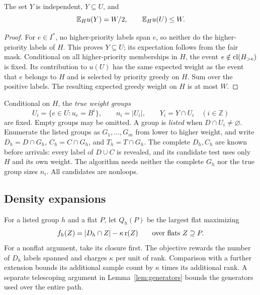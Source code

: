 \begin{lemma}\label{lem:filter}
The set $Y$ is independent, $Y\subseteq U$, and
\begin{equation}\label{eq:candidate-mass}
 \mathbb E_H u(Y)=W/2,\qquad \mathbb E_H u(U)\le W.
\end{equation}
\end{lemma}
\begin{proof}
For $e\in I^*$, no higher-priority labels span $e$, so neither do the
higher-priority labels of $H$. This proves $Y\subseteq U$; its expectation
follows from the fair mask. Conditional on all higher-priority memberships
in $H$, the event $e\notin\operatorname{cl}(H_{>e})$ is fixed. Its contribution to $u(U)$
has the same expected weight as the event that $e$ belongs to $H$ and is
selected by priority greedy on $H$. Sum over the positive labels.
The resulting expected greedy weight on $H$ is at most $W$.
\end{proof}

Conditional on $H$, the \emph{true weight groups}
\[
 U_i=\{e\in U:u_e=B^i\},\qquad n_i=|U_i|,\qquad Y_i=Y\cap U_i
 \quad(i\in\mathbb Z)
\]
are fixed. Empty groups may be omitted. A group is \emph{listed} when
$D\cap U_i\ne\varnothing$. Enumerate the listed groups as $G_1,\ldots,G_m$
from lower to higher weight, and write $D_h=D\cap G_h$, $C_h=C\cap G_h$,
and $T_h=T\cap G_h$. The complete $D_h,C_h$ are known before arrivals:
every label of $D\cup C$ is revealed, and its candidate test uses only $H$
and its own weight. The algorithm needs neither the complete $G_h$ nor
the true group sizes $n_i$. All candidates are nonloops.

\subsection{Density expansions}

For a listed group $h$ and a flat $P$, let $Q_h(P)$ be the largest flat
maximizing
\begin{equation}\label{eq:density-objective}
 f_h(Z)=|D_h\cap Z|-\kappa\operatorname{r}(Z)
 \qquad\text{over flats }Z\supseteq P.
\end{equation}
For a nonflat argument, take its closure first. The objective rewards the
number of $D_h$ labels spanned and charges $\kappa$ per unit of rank.
Comparison with a further extension bounds its additional sample count
by $\kappa$ times its additional rank. A separate telescoping argument in
Lemma~\ref{lem:generators} bounds the generators used over the entire path.

